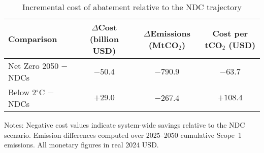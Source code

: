 \begin{table}[ht]
  \centering
  \caption{Incremental cost of abatement relative to the NDC trajectory}
  \label{tab:cost-abatement}
  \begin{threeparttable}
  \begin{tabular}{@{}lccc@{}}
    \toprule
    Comparison & $\Delta$Cost (billion USD) & $\Delta$Emissions (MtCO$_2$) & Cost per tCO$_2$ (USD) \\
    \midrule
    Net Zero 2050 $-$ NDCs & $-50.4$ & $-790.9$ & $-63.7$ \\
    Below 2$^\circ$C $-$ NDCs & $+29.0$ & $-267.4$ & $+108.4$ \\
    \bottomrule
  \end{tabular}
  \begin{tablenotes}
    \footnotesize
    \item Notes: Negative cost values indicate system-wide savings relative to the NDC scenario. Emission differences computed over 2025--2050 cumulative Scope~1 emissions. All monetary figures in real 2024 USD.
  \end{tablenotes}
  \end{threeparttable}
\end{table}
